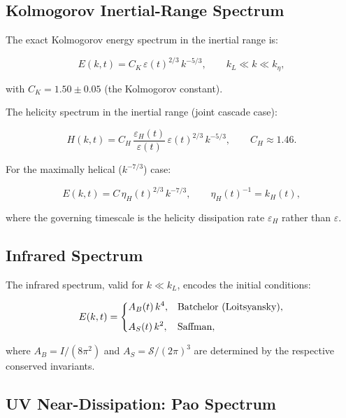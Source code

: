 \documentclass[12pt,a4paper]{article}
\newcommand{\eps}{\varepsilon}
\newcommand{\epsh}{\varepsilon_{H}}
\newcommand{\keta}{k_{\eta}}
\newcommand{\kH}{k_{H}}
\newcommand{\kL}{k_{L}}
\newcommand{\CK}{C_{K}}
\newcommand{\CH}{C_{H}}
\newcommand{\Saffman}{\mathcal{S}}
\theoremstyle{plain}
\theoremstyle{definition}
\begin{document}
\subsection{Kolmogorov Inertial-Range Spectrum}

The exact Kolmogorov energy spectrum in the inertial range is:

\begin{equation}
  E(k,t) = \CK\,\eps(t)^{2/3}\,k^{-5/3},\qquad
  \kL \ll k \ll \keta,
  \label{eq:kolmogorov_spectrum}
\end{equation}

with $\CK = 1.50\pm 0.05$ (the Kolmogorov constant).

The helicity spectrum in the inertial range (joint cascade case):

\begin{equation}
  H(k,t) = \CH\,\frac{\epsh(t)}{\eps(t)}\,\eps(t)^{2/3}\,k^{-5/3},\qquad
  \CH \approx 1.46.
  \label{eq:helicity_spectrum_inertial}
\end{equation}

For the maximally helical ($k^{-7/3}$) case:

\begin{equation}
  E(k,t) = C\,\eta_H(t)^{2/3}\,k^{-7/3},\qquad
  \eta_H(t)^{-1} = \kH(t),
  \label{eq:maximal_helicity_spectrum}
\end{equation}

where the governing timescale is the helicity dissipation rate
$\epsh$ rather than $\eps$.

\subsection{Infrared Spectrum}

The infrared spectrum, valid for $k\ll\kL$, encodes the initial
conditions:

\begin{equation}
  E(k,t) =
  \begin{dcases}
    A_B(t)\,k^4, & \text{Batchelor (Loitsyansky)},\\[4pt]
    A_S(t)\,k^2, & \text{Saffman},
  \end{dcases}
  \label{eq:infrared}
\end{equation}

where $A_B = I/(8\pi^2)$ and $A_S = \Saffman/(2\pi)^3$ are
determined by the respective conserved invariants.

\subsection{UV Near-Dissipation: Pao Spectrum}
\end{document}
